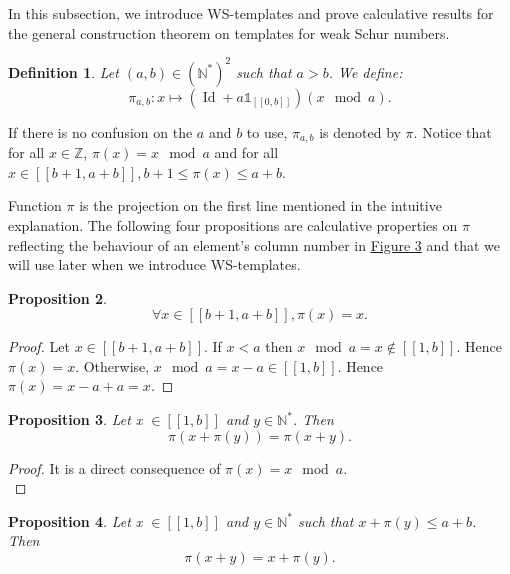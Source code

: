 \documentclass{article}
\newtheorem{definition}{Definition}[section]
\newtheorem{computational theorem}[definition]{Computational Theorem}
\newtheorem{proposition}[definition]{Proposition}
\begin{document}
In this subsection, we introduce WS-templates and prove calculative results for the general construction
theorem on templates for weak Schur numbers.

\begin{definition}
Let \((a,b) \in (\mathbb{N}^*)^2\) such that \(a>b\). We define:
\[ \pi_{a,b}:x \longmapsto (\operatorname{Id}+a\mathds{1}_{ [\![0,b]\!]})(x \mod a).\]
\end{definition}

\begin{sloppypar}
If there is no confusion on the \(a\) and \(b\) to use, \(\pi_{a, b}\) is denoted by \(\pi\). Notice that for all \(x \in \mathbb{Z}\), 
\({\pi(x) = x \mod a}\) and for all \(x \in [\![b + 1, a + b]\!], b + 1 \leqslant \pi(x) \leqslant a + b\).
\end{sloppypar}

\begin{sloppypar}
Function \(\pi\) is the projection on the first line mentioned in the intuitive explanation. The following four propositions are
calculative properties on \(\pi\) reflecting the behaviour of an element's column number in \hyperref[SchemaWS]{Figure 3} and
that we will use later when we introduce WS-templates.
\end{sloppypar}

\begin{proposition}
\label{prop1}
\[
\forall x \in [\![b + 1, a + b]\!], \pi(x) = x.
\]
\end{proposition}

\begin{proof}
\begin{sloppypar}
Let \(x \in [\![b + 1, a + b]\!]\). If \(x < a\) then \(x \mod a = x \notin [\![1, b]\!]\). Hence \(\pi(x) = x\).
Otherwise, \({x \mod a = x - a \in [\![1, b]\!]}\). Hence \({\pi(x) = x - a + a = x}\).
\end{sloppypar}
\end{proof}

\begin{proposition}
\label{prop2}
Let x \(\in [\![1,b]\!]\) and \(y \in \mathbb{N}^*\). Then
\[
\pi(x+\pi(y)) = \pi(x+y).
\]
\end{proposition}

\begin{proof}
It is a direct consequence of \(\pi(x) = x \mod a\). \\
\end{proof}

\begin{proposition}
\label{prop3}
Let x \(\in [\![1,b]\!]\) and \(y \in \mathbb{N}^*\) such that \(x+\pi(y) \leqslant a+b\). Then
\[
\pi(x+y)=x+\pi(y).
\]
\end{proposition}
\end{document}
